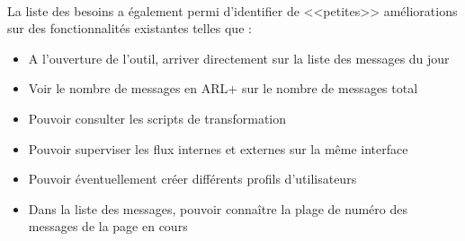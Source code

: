 			\paragraph{}%
			La liste des besoins a également permi d'identifier de <<petites>>
			améliorations sur des fonctionnalités existantes telles que :
			\begin{itemize}
			  \item A l'ouverture de l'outil, arriver directement sur la liste des
			  messages du jour
			  \item Voir le nombre de messages en ARL+ sur le nombre de messages total
			  \item Pouvoir consulter les scripts de transformation
			  \item Pouvoir superviser les flux internes et externes sur la même
			  interface
			  \item Pouvoir éventuellement créer différents profils d'utilisateurs
			  \item Dans la liste des messages, pouvoir connaître la plage de numéro des
			  messages de la page en cours
			\end{itemize}
			